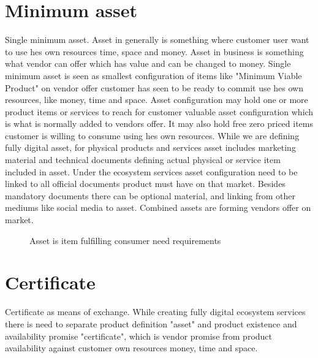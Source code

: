 \section{Minimum asset}
\label{minimum_asset}
Single minimum asset.
Asset in generally is something where customer user want to use hes own
resources time, space and money. Asset in business is something what vendor
can offer which has value and can be changed to money. Single minimum asset is
seen as smallest configuration of items like "Minimum Viable Product" on
vendor offer customer has seen to be ready to commit use hes own resources,
like money, time and space. Asset configuration may hold one or more product
items or services to reach for customer valuable asset configuration which is
what is normally added to vendors offer. It may also hold free zero priced
items customer is willing to consume using hes own resources. While we are
defining fully digital asset, for physical products and services asset
includes marketing material and technical documents defining actual physical
or service item included in asset. Under the ecosystem services asset
configuration need to be linked to all official documents product must have on
that market. Besides mandatory documents there can be optional material, and
linking from other mediums like social media to asset. Combined assets are
forming vendors offer on market.

\begin{figure} %
 \begin{center}
  \caption{Asset is item fulfilling consumer need requirements}
  \label{fig:asset}
 \end{center}
\end{figure}


\section{Certificate}
\label{certificate}
Certificate as means of exchange.
While creating fully digital ecosystem services there is need to separate
product definition "asset" and product existence and availability promise
"certificate", which is vendor promise from product availability against
customer own resources money, time and space.

